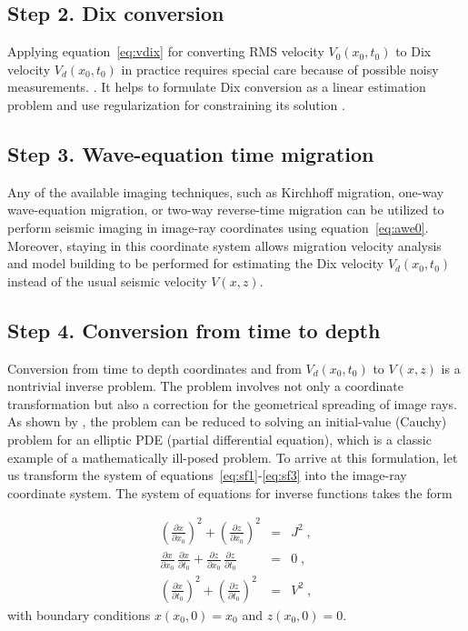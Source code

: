 \subsection{Step 2. Dix conversion}

Applying equation~\ref{eq:vdix} for converting RMS velocity $V_0(x_0,t_0)$ to Dix velocity $V_d(x_0,t_0)$ in practice requires special care because of
possible noisy measurements. . It helps to formulate Dix conversion as a linear estimation problem and use regularization for constraining
its solution \cite[]{Clapp.sep.97.bob1,alejandro,pwc,shape}. 

\subsection{Step 3. Wave-equation time migration}

Any of the available imaging techniques, such as Kirchhoff migration,
one-way wave-equation migration, or two-way reverse-time
migration can be utilized to
perform seismic imaging in image-ray coordinates using
equation~\ref{eq:awe0}. Moreover, staying in this coordinate system
allows migration velocity analysis and model building to be performed
for estimating the Dix velocity $V_d(x_0,t_0)$ instead of the usual
seismic velocity $V(x,z)$.

\subsection{Step 4. Conversion from time to depth}

Conversion from time to depth coordinates and from $V_d(x_0,t_0)$ to
$V(x,z)$ is a nontrivial inverse problem. The problem involves not
only a coordinate transformation \cite[]{hatton,larner} but also a
correction for the geometrical spreading of image rays. As shown
by \cite{jcp}, the problem can be reduced to solving an initial-value
(Cauchy) problem for an elliptic PDE (partial differential equation),
which is a classic example of a mathematically ill-posed problem.
To arrive at this formulation, let us transform the system of
equations~\ref{eq:sf1}-\ref{eq:sf3} into the image-ray coordinate
system. The system of equations for inverse functions takes the form \cite[]{siwei2}

\begin{eqnarray}
\label{eq:igradx}
\left(\frac{\partial x}{\partial x_0}\right)^2 +  \left(\frac{\partial z}{\partial x_0}\right)^2 & = & J^2\;, \\
\label{eq:idotp}
\frac{\partial x}{\partial x_0}\,\frac{\partial x}{\partial t_0} + \frac{\partial z}{\partial x_0}\,\frac{\partial z}{\partial t_0} & = & 0\;, \\
\label{eq:igradt}
\left(\frac{\partial x}{\partial t_0}\right)^2 +  \left(\frac{\partial z}{\partial t_0}\right)^2 & = & V^2\;,
\end{eqnarray}
with boundary conditions $x(x_0,0) = x_0$ and $z(x_0,0) = 0$. 

